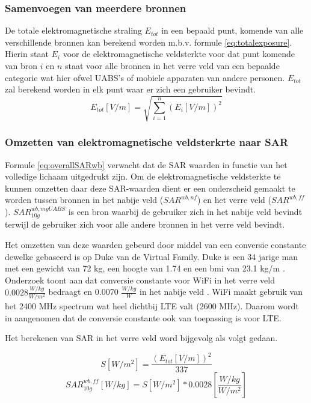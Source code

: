 \documentclass[twocolumn]{phdsymp} %
\begin{document}
\subsubsection{Samenvoegen van meerdere bronnen}

De totale elektromagnetische straling $E_{tot}$ in een bepaald punt, komende van alle verschillende bronnen kan berekend worden 
m.b.v. formule \ref{eq:totalexposure}. Hierin staat $E_i$ voor de elektromagnetische veldsterkte voor dat punt komende van bron $i$
en $n$ staat voor alle bronnen in het verre veld van een bepaalde categorie wat hier ofwel \gls{UABS}'s of mobiele apparaten van andere personen.
$E_{tot}$ zal berekend worden in elk punt waar er zich een gebruiker bevindt.
\begin{equation}
E_{tot} [V/m] = \sqrt{\sum_{i=1}^{n} (E_i [V/m]) ^2}
\label{eq:totalexposure}
\end{equation}

\subsubsection{Omzetten van elektromagnetische veldsterkrte naar \gls{SAR}}

Formule \ref{eq:overallSARwb}  verwacht dat de \gls{SAR} waarden in functie van het volledige lichaam uitgedrukt zijn.
Om de elektromagnetische veldsterkte te kunnen omzetten daar deze \gls{SAR}-waarden dient er een onderscheid gemaakt te worden 
tussen bronnen in het nabije veld ($SAR^{wb,nf}$) en het verre veld ($SAR^{wb,ff}$).
$SAR^{wb,myUABS}_{10g}$ is een bron waarbij de gebruiker zich in het nabije veld bevindt terwijl 
de gebruiker zich voor alle andere bronnen in het verre veld bevindt.

Het omzetten van deze waarden gebeurd door middel van een conversie constante dewelke gebaseerd is op 
Duke van de Virtual Family. Duke is een 34 jarige man met een gewicht van 72 kg, een hoogte van 1.74 en 
een bmi van 23.1 kg/m \cite{J22_plets2015joint}. 
Onderzoek toont aan dat conversie constante voor WiFi in het verre veld $0.0028 \frac{W/kg}{W/m^2}$ bedraagt
en  0.0070 $\frac{W/kg}{W}$ in het nabije veld \cite{J22_plets2015joint}.
WiFi maakt gebruik van het 2400 MHz spectrum wat heel dichtbij \gls{LTE} valt (2600 MHz). Daarom 
wordt in \cite{J22_plets2015joint} aangenomen dat de conversie  constante ook van toepassing is voor \gls{LTE}.

Het berekenen van \gls{SAR} in het verre veld  word bijgevolg als volgt gedaan.

\begin{equation}
S [W/m^2]= \frac{(E_{tot} [V/m])^2}{337}
\label{eq:flux}
\end{equation}
\begin{equation}
SAR^{wb,ff}_{10g} [W/kg]= S [W/m^2]* 0.0028 \left[\frac{W/kg}{W/m^2}\right]
\label{eq:DLconversion}
\end{equation}
\end{document}
